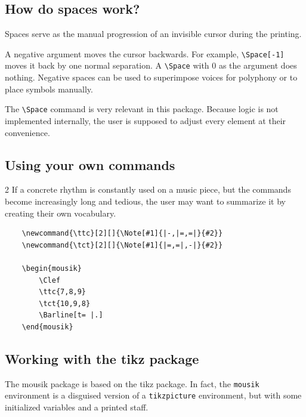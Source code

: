 \documentclass[final]{article}
\begin{document}
	
	\subsection*{How do spaces work?}
	
	Spaces serve as the manual progression of an invisible cursor during the printing.
	
	A negative argument moves the cursor backwards. For example, \verb|\Space[-1]| moves it back by one normal separation. A \verb|\Space| with 0 as the argument does nothing. Negative spaces can be used to superimpose voices for polyphony or to place symbols manually.
	
	The \verb|\Space| command is very relevant in this package. Because logic is not implemented internally, the user is supposed to adjust every element at their convenience.
	
	\subsection*{Using your own commands}
	\begin{multicols}{2}
		If a concrete rhythm is constantly used on a music piece, but the commands become increasingly long and tedious, the user may want to summarize it by creating their own vocabulary.
		
		\newcommand{\ttc}[2][]{\Note[#1]{|-,|=,=|}{#2}}
		\newcommand{\tct}[2][]{\Note[#1]{|=,=|,-|}{#2}}
		\begin{mousik}
			\Clef
			\ttc{7,8,9}
			\tct{10,9,8}
			\Barline[t= |.]
		\end{mousik}
	\end{multicols}
	
	
	\begin{lstlisting}
	\newcommand{\ttc}[2][]{\Note[#1]{|-,|=,=|}{#2}}
	\newcommand{\tct}[2][]{\Note[#1]{|=,=|,-|}{#2}}
	
	\begin{mousik}
		\Clef
		\ttc{7,8,9}
		\tct{10,9,8}
		\Barline[t= |.]
	\end{mousik}
	\end{lstlisting}
	
	\subsection*{Working with the \textsf{tikz} package}
	The \textsf{mousik} package is based on the \textsf{tikz} package. In fact, the \texttt{mousik} environment is a disguised version of a \texttt{tikzpicture} environment, but with some initialized variables and a printed staff.
	
\end{document}
